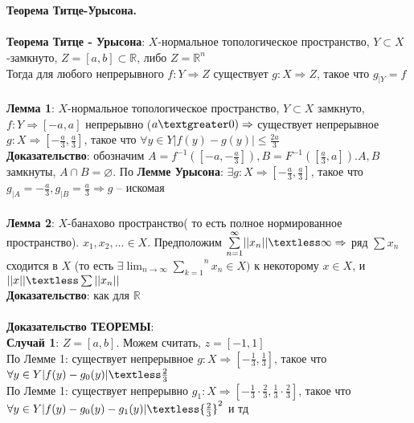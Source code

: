 \newpage
\section{}
	\textbf{Теорема Титце-Урысона.}\\
	\\
	\textbf{Теорема Титце - Урысона}: $X$-нормальное топологическое пространство, $Y\subset X$-замкнуто, $Z=[a,b] \subset \mathbb{R}$, либо $Z=\mathbb{R}^n$\\
	Тогда для любого непрерывного $f: Y \Rightarrow Z$ существует $g: X \Rightarrow Z$, такое что $g_{|Y}=f$\\
	\\
	\textbf{Лемма 1}: $X$-нормальное топологическое пространство, $Y\subset X$ замкнуто, $f: Y \Rightarrow [ - a,a]$ непрерывно ($a\textgreater 0) \Rightarrow$ существует непрерывное $g: X \Rightarrow [ - \frac{a}{3}, \frac{a}{3}]$, такое что $\forall y\in Y |f(y) - g(y)| \leqslant \frac{2a}{3}$\\
	\textbf{Доказательство}: обозначим $A=f^{-1} ([ - a,- \frac{a}{3}]), B=F^{-1} ([\frac{a}{3}, a]). A,B$ замкнуты, $A\cap B=\varnothing$. По \textbf{Лемме Урысона}: $\exists g: X \Rightarrow [ - \frac{a}{3}, \frac{a}{3}]$, такое что $g_{|A}= - \frac{a}{3}, g_{|B}=\frac{a}{3} \Rightarrow g$ -- искомая\\
	\\
	\textbf{Лемма 2}: $X$-банахово пространство( то есть полное нормированное пространство). $x_1,x_2,\ldots \in X$. Предположим $\overset{\infty}{\underset{n = 1}{\sum}} ||x_n|| \textless \infty \Rightarrow$ ряд $\sum x_n$ сходится в $X$ (то есть $\exists \lim_{n\rightarrow \infty} \overset{n}{\underset{k = 1}{\sum}} x_n \in X)$ к некоторому $x\in X$, и $||x|| \textless \sum ||x_n||$\\
	\textbf{Доказательство}: как для $\mathbb{R}$\\
	\\
	\textbf{Доказательство ТЕОРЕМЫ}: \\
	\textbf{Случай 1}: $Z=[a,b]$. Можем считать, $z=[ - 1,1]$\\
	По Лемме 1: существует непрерывное $g: X \Rightarrow [ - \frac{1}{3}, \frac{1}{3}]$, такое что $\forall y\in Y |f(y)- g_0 (y)| \textless \frac{2}{3}$\\
	По Лемме 1: существует непрерывно $g_1: X \Rightarrow [ - \frac{1}{3}\cdot \frac{2}{3}, \frac{1}{3}\cdot \frac{2}{3}]$, такое что $\forall y\in Y |f(y)- g_0 (y)-g_1 (y)| \textless {\frac{2}{3}}^2$ и тд\\
